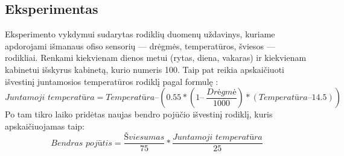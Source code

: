\documentclass{VUMIFPSbakalaurinis}
\begin{document}
\subsection{Eksperimentas}

Eksperimento vykdymui sudarytas rodiklių duomenų uždavinys, kuriame apdorojami išmanaus ofiso sensorių — drėgmės, temperatūros, šviesos — rodikliai. Renkami kiekvienam dienos metui (rytas, diena, vakaras) ir kiekvienam kabinetui išskyrus kabinetą, kurio numeris 100. Taip pat reikia apskaičiuoti išvestinį juntamosios temperatūros rodiklį pagal formulę \cite{anderson2013methods}: 
\[\textit{Juntamoji temperatūra} = \textit{Temperatūra} – (0.55 * (1 –\>\frac{\textit{Drėgmė}}{1000}) * (\textit{Temperatūra} – 14.5))\]
Po tam tikro laiko pridėtas naujas bendro pojūčio išvestinį rodiklį, kuris apskaičiuojamas taip: 
\[\textit{Bendras pojūtis} = \frac{\textit{Šviesumas}}{75} * \frac{\textit{Juntamoji temperatūra}}{25} \]
\end{document}
